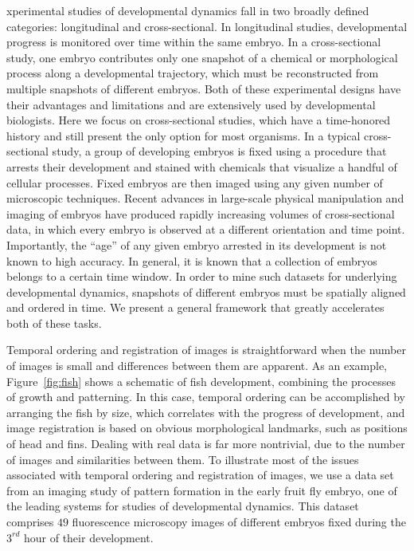 \documentclass{pnastwo}
\begin{document}
\begin{article}
xperimental studies of developmental dynamics fall in two broadly defined categories: longitudinal and cross-sectional. 
%
In longitudinal studies, developmental progress is monitored over time within the same embryo. 
%
In a cross-sectional study, one embryo contributes only one snapshot of a chemical or morphological process along a developmental trajectory, which must be reconstructed from multiple snapshots of different embryos. 
%
Both of these experimental designs have their advantages and limitations and are extensively used by developmental biologists. 
%
Here we focus on cross-sectional studies, which have a time-honored history and still present the only option for most organisms. 
%
In a typical cross-sectional study, a group of developing embryos is fixed using a procedure that arrests their development and stained with chemicals that visualize a handful of cellular processes. 
%
Fixed embryos are then imaged using any given number of microscopic techniques. 
%
Recent advances in large-scale physical manipulation and imaging of embryos have produced rapidly increasing volumes of cross-sectional data, in which every embryo is observed at a different orientation and time point.
%
Importantly, the ``age'' of any given embryo arrested in its development is not known to high accuracy. 
%
In general, it is known that a collection of embryos belongs to a certain time window.
%
In order to mine such datasets for underlying developmental dynamics, snapshots of different embryos must be spatially aligned and ordered in time. 
%
We present a general framework that greatly accelerates both of these tasks.

Temporal ordering and registration of images is straightforward when the number of images is small and differences between them are apparent. 
%
As an example, Figure~\ref{fig:fish} shows a schematic of fish development, combining the processes of growth and patterning.  
%
In this case, temporal ordering can be accomplished by arranging the fish by size, which correlates with the progress of development, and image registration is based on obvious morphological landmarks, such as positions of head and fins. 
%
Dealing with real data is far more nontrivial, due to the number of images and similarities between them. 
%
To illustrate most of the issues associated with temporal ordering and registration of images, we use a data set from an imaging study of pattern formation in the early fruit fly embryo, one of the leading systems for studies of developmental dynamics. 
%
This dataset comprises $49$ fluorescence microscopy images of different embryos fixed during the $3^{rd}$ hour of their development. 


\end{article}
\end{document}
